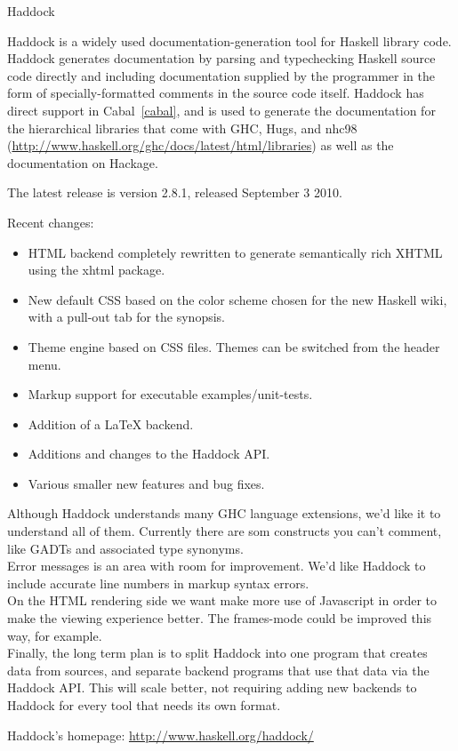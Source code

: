 \begin{hcarentry}{Haddock}
\label{haddock}
\makeheader

Haddock is a widely used documentation-generation tool for Haskell
library code.  Haddock generates documentation by parsing and typechecking
Haskell source code directly and including documentation supplied by the
programmer in the form of specially-formatted comments in the source code
itself.  Haddock has direct support in Cabal~\cref{cabal}, and is used to
generate the documentation for the hierarchical libraries that come with GHC,
Hugs, and nhc98
(\url{http://www.haskell.org/ghc/docs/latest/html/libraries}) as well as
the documentation on Hackage.

The latest release is version 2.8.1, released September 3 2010.

\Separate
Recent changes:
\begin{itemize}

\item HTML backend completely rewritten to generate semantically rich XHTML
      using the xhtml package.
\item New default CSS based on the color scheme chosen for the new Haskell
      wiki, with a pull-out tab for the synopsis.
\item Theme engine based on CSS files. Themes can be switched from the
      header menu.
\item Markup support for executable examples/unit-tests.
\item Addition of a LaTeX backend.
\item Additions and changes to the Haddock API.
\item Various smaller new features and bug fixes.

\end{itemize}

\FuturePlans
Although Haddock understands many GHC language extensions, we'd like it to
understand all of them. Currently there are som constructs you can't comment,
like GADTs and associated type synonyms.
\\ 
Error messages is an area with room for improvement. We'd like Haddock
to include accurate line numbers in markup syntax errors.
\\
On the HTML rendering side we want make more use of Javascript in order to make
the viewing experience better. The frames-mode could be improved this way, for
example.
\\
Finally, the long term plan is to split Haddock into one program that creates
data from sources, and separate backend programs that use that data via the
Haddock API. This will scale better, not requiring adding new backends to Haddock
for every tool that needs its own format.
\FurtherReading
\begin{compactitem}
\item Haddock's homepage:
\url{http://www.haskell.org/haddock/}


\end{compactitem}
\end{hcarentry}

